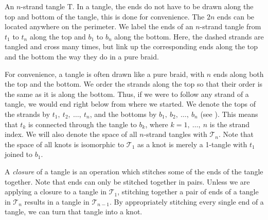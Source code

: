 \begin{paper}
{An $n$-strand tangle T.
In a tangle, the ends do not have to be drawn along the top and bottom of the
tangle, this is done for convenience.
The $2n$ ends can be located anywhere on the perimeter.
We label the ends of an $n$-strand tangle from $t_1$ to $t_n$ along the top and
$b_1$ to $b_n$ along the bottom.
Here, the dashed strands are tangled and cross many times, but link up the
corresponding ends along the top and the bottom the way they do in a pure
braid.}

For convenience, a tangle is often drawn like a pure braid, with $n$ ends along
both the top and the bottom.
We order the strands along the top so that their order is the same as it is
along the bottom.
Thus, if we were to follow any strand of a tangle, we would end right below
from where we started.
We denote the tops of the strands by $t_1,~t_2,~\dots,~t_n$, and the
bottoms by $b_1,~b_2,~\dots,~b_n$ (see \figTangle).
This means that $t_k$ is connected through the tangle to $b_k$, where
$k=1,~\dots,~n$ is the strand index.
We will also denote the space of all $n$-strand tangles with $\mathcal{T}_n$.
Note that the space of all knots is isomorphic to $\mathcal{T}_1$ as a knot is
merely a 1-tangle with $t_1$ joined to $b_1$.

A \textit{closure} of a tangle is an operation which stitches some of the ends
of the tangle together.
Note that ends can only be stitched together in pairs.
Unless we are applying a closure to a tangle in $\mathcal{T}_1$, stitching
together a pair of ends of a tangle in $\mathcal{T}_n$ results in a tangle in
$\mathcal{T}_{n-1}$.
By appropriately stitching every single end of a tangle, we can turn that tangle
into a knot.\\


\end{paper}
